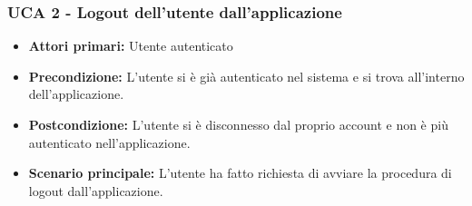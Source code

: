 \newpage
\subsubsection{UCA 2 - Logout dell'utente dall'applicazione}%
\begin{itemize}
\item \textbf{Attori primari:} Utente autenticato
\item \textbf{Precondizione:} L'utente si è già autenticato nel sistema e si trova all'interno dell'applicazione.
\item \textbf{Postcondizione:}  L'utente si è disconnesso dal proprio account e non è più autenticato nell'applicazione.
\item \textbf{Scenario principale:} L'utente ha fatto richiesta di avviare la procedura di logout dall'applicazione.
\end{itemize}